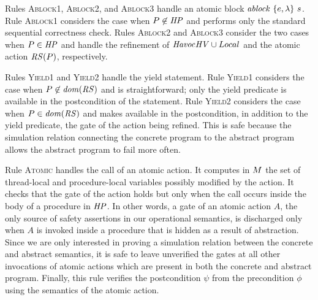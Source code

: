 Rules \textsc{Ablock1}, \textsc{Ablock2}, and \textsc{Ablock3} handle an atomic block $\mathit{ablock}\ {\{e,\lambda\}}\ {s}$.
Rule \textsc{Ablock1} considers the case when $P \not \in \mathit{HP}$ and performs only the 
standard sequential correctness check.
Rules \textsc{Ablock2} and \textsc{Ablock3} consider the two cases when $P \in \mathit{HP}$ and handle
the refinement of $\mathit{Havoc}{\mathit{HV} \cup Local}$ and the atomic action $\mathit{RS}(P)$, respectively.

Rules \textsc{Yield1} and \textsc{Yield2} handle the yield statement.
Rule \textsc{Yield1} considers the case when $P \not \in \mathit{dom}(\mathit{RS})$ and is straightforward;
only the yield predicate is available in the postcondition of the statement.
Rule \textsc{Yield2} considers the case when $P \in \mathit{dom}(\mathit{RS})$ and makes available in the postcondition, in 
addition to the yield predicate, the gate of the action being refined.
This is safe because the simulation relation connecting the concrete program to the abstract program
allows the abstract program to fail more often.

Rule \textsc{Atomic} handles the call of an atomic action.
It computes in $M$ the set of thread-local and procedure-local variables possibly modified by the action.
It checks that the gate of the action holds but only when the call occurs inside the body of a procedure in $\mathit{HP}$.
In other words, a gate of an atomic action $A$, the only source of safety assertions in our operational semantics, is discharged 
only when $A$ is invoked inside a procedure that is hidden as a result of abstraction.
Since we are only interested in proving a simulation relation between the concrete and abstract semantics, 
it is safe to leave unverified the gates at all other invocations of atomic actions which are present in both the concrete and abstract program.
Finally, this rule verifies the postcondition $\psi$ from the precondition $\phi$ using the semantics of the atomic action.

